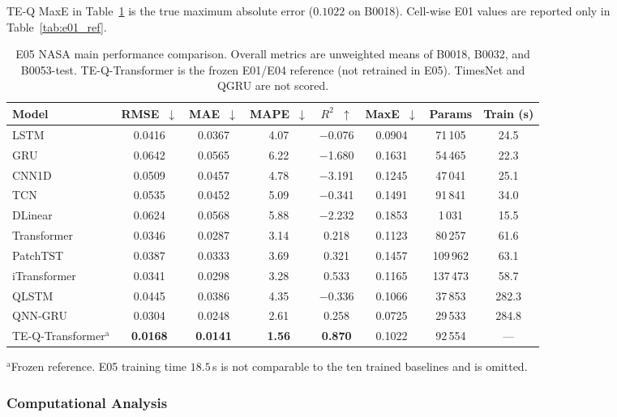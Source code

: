 TE-Q MaxE in Table~\ref{tab:main_benchmark} is the true maximum absolute error ($0.1022$ on B0018). Cell-wise E01 values are reported only in Table~\ref{tab:e01_ref}.

\begin{table}[t]
\centering
\caption{E05 NASA main performance comparison. Overall metrics are unweighted means of B0018, B0032, and B0053-test. TE-Q-Transformer is the frozen E01/E04 reference (not retrained in E05). TimesNet and QGRU are not scored.}\label{tab:main_benchmark}
\footnotesize
\begin{tabular}{@{}lccccccc@{}}
\toprule
Model & RMSE~$\downarrow$ & MAE~$\downarrow$ & MAPE~$\downarrow$ & $R^2$~$\uparrow$ & MaxE~$\downarrow$ & Params & Train (s) \\
\midrule
LSTM & 0.0416 & 0.0367 & 4.07 & $-$0.076 & 0.0904 & 71\,105 & 24.5 \\
GRU & 0.0642 & 0.0565 & 6.22 & $-$1.680 & 0.1631 & 54\,465 & 22.3 \\
CNN1D & 0.0509 & 0.0457 & 4.78 & $-$3.191 & 0.1245 & 47\,041 & 25.1 \\
TCN & 0.0535 & 0.0452 & 5.09 & $-$0.341 & 0.1491 & 91\,841 & 34.0 \\
DLinear & 0.0624 & 0.0568 & 5.88 & $-$2.232 & 0.1853 & 1\,031 & 15.5 \\
Transformer & 0.0346 & 0.0287 & 3.14 & 0.218 & 0.1123 & 80\,257 & 61.6 \\
PatchTST & 0.0387 & 0.0333 & 3.69 & 0.321 & 0.1457 & 109\,962 & 63.1 \\
iTransformer & 0.0341 & 0.0298 & 3.28 & 0.533 & 0.1165 & 137\,473 & 58.7 \\
QLSTM & 0.0445 & 0.0386 & 4.35 & $-$0.336 & 0.1066 & 37\,853 & 282.3 \\
QNN-GRU & 0.0304 & 0.0248 & 2.61 & 0.258 & 0.0725 & 29\,533 & 284.8 \\
TE-Q-Transformer$^{\mathrm{a}}$ & \textbf{0.0168} & \textbf{0.0141} & \textbf{1.56} & \textbf{0.870} & 0.1022 & 92\,554 & --- \\
\bottomrule
\end{tabular}
\vspace{2pt}
\begin{minipage}{\textwidth}
\footnotesize $^{\mathrm{a}}$Frozen reference. E05 training time $18.5$\,s is not comparable to the ten trained baselines and is omitted.
\end{minipage}
\end{table}

\subsubsection{Computational Analysis}
\label{sec:computational_analysis}

